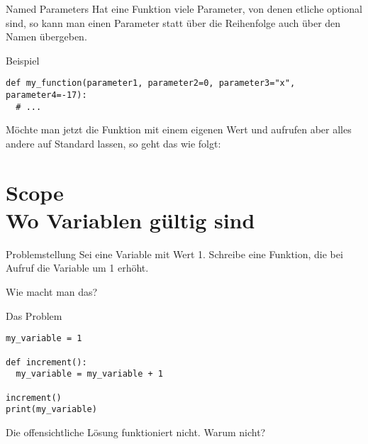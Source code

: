 \begin{fragile}
	
\begin{block}{Named Parameters}
\vspace{2pt}
Hat eine Funktion viele Parameter, von denen etliche optional sind, so kann man einen Parameter statt über die Reihenfolge auch über den Namen übergeben. 
\end{block}

\pause 
\vspace{12pt}

\begin{exampleblock}{Beispiel}
\vspace{2pt}

\begin{verbatim}
def my_function(parameter1, parameter2=0, parameter3="x", parameter4=-17):
  # ... 
\end{verbatim}
Möchte man jetzt die Funktion mit einem eigenen Wert  und  aufrufen aber alles andere auf Standard lassen, so geht das wie folgt: 

\end{exampleblock}

	
\end{fragile}

\section{Scope \\ \footnotesize Wo Variablen gültig sind}


\begin{frame}
\begin{block}{Problemstellung}
\vspace{2pt}
Sei  eine Variable mit Wert 1. 
Schreibe eine Funktion, die bei Aufruf die Variable  um 1 erhöht. 

\vspace{8pt}

Wie macht man das? 
\end{block}
\end{frame}

\begin{fragile}
	
\begin{block}{Das Problem}
\vspace{2pt}

\begin{verbatim}
my_variable = 1

def increment(): 
  my_variable = my_variable + 1

increment()
print(my_variable)
\end{verbatim}

\pause 
Die offensichtliche Lösung 
funktioniert nicht. Warum nicht? 
\end{block}
\end{fragile}


